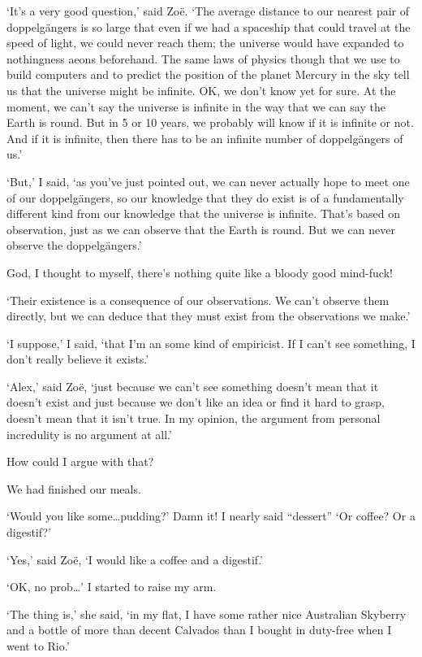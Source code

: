 `It's a very good question,' said Zoë. `The average distance to
our nearest pair of doppelgängers is so large that even if we
had a spaceship that could travel at the speed of light, we could
never reach them; the universe would have expanded to nothingness
aeons beforehand. The same laws of physics though that we use to build
computers and to predict the position of the planet Mercury in the
sky tell us that the universe might be infinite. OK, we don't know
yet for sure. At the moment, we can't say the universe is infinite
in the way that we can say the Earth is round. But in 5 or 10 years,
we probably will know if it is infinite or not. And if it is
infinite, then there has to be an infinite number of
doppelgängers of us.'

`But,' I said, `as you've just pointed out, we can never actually
hope to meet one of our doppelgängers, so our knowledge that
they do exist is of a fundamentally different kind from our
knowledge that the universe is infinite. That's based on
observation, just as we can observe that the Earth is round. But we
can never observe the doppelgängers.'

God, I thought to myself, there's nothing quite like a bloody good
mind-fuck!

`Their existence is a consequence of our observations. We can't
observe them directly, but we can deduce that they must exist from
the observations we make.'

`I suppose,' I said, `that I'm an some kind of empiricist. If I
can't see something, I don't really believe it exists.'

`Alex,' said Zoë, `just because we can't see something
doesn't mean that it doesn't exist and just because we don't like an
idea or find it hard to grasp, doesn't mean that it isn't true. In
my opinion, the argument from personal incredulity is no argument at
all.'

How could I argue with that?

We had finished our meals.

`Would you like some\dots pudding?' Damn it! I nearly said
``dessert'' `Or coffee? Or a digestif?'

`Yes,' said Zoë, `I would like a coffee and a
digestif.'

`OK, no prob\dots' I started to raise my arm.

`The thing is,' she said, `in my flat, I have some rather nice
Australian Skyberry and a bottle of more than decent Calvados than I
bought in duty-free when I went to Rio.'

